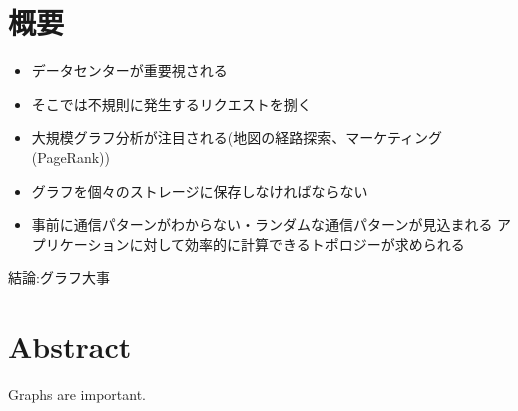 \chapter*{概要}
\begin{itemize}
\item データセンターが重要視される
\item そこでは不規則に発生するリクエストを捌く
\item 大規模グラフ分析が注目される(地図の経路探索、マーケティング(PageRank))
\item グラフを個々のストレージに保存しなければならない
\item 事前に通信パターンがわからない・ランダムな通信パターンが見込まれる
アプリケーションに対して効率的に計算できるトポロジーが求められる
\end{itemize}

結論:グラフ大事

\begingroup
\renewcommand{\cleardoublepage}{}
\renewcommand{\clearpage}{}
\chapter*{Abstract}
\endgroup
Graphs are important.
